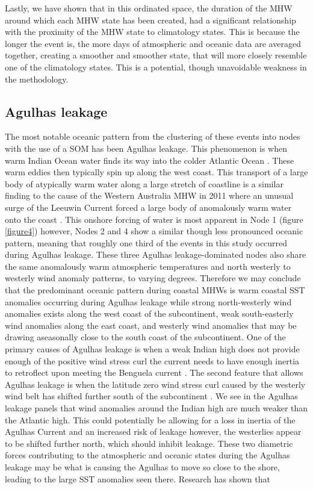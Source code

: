 \documentclass[utf8]{frontiersSCNS}
\begin{document}
Lastly, we have shown that in this ordinated space, the duration of the MHW around which each MHW state has been created, had a significant relationship with the proximity of the MHW state to climatology states. This is because the longer the event is, the more days of atmospheric and oceanic data are averaged together, creating a smoother and smoother state, that will more closely resemble one of the climatology states. This is a potential, though unavoidable weakness in the methodology.

\subsection{Agulhas leakage}
The most notable oceanic pattern from the clustering of these events into nodes with the use of a SOM has been Agulhas leakage. This phenomenon is when warm Indian Ocean water finds its way into the colder Atlantic Ocean \citep{Beal2011}. These warm eddies then typically spin up along the west coast. This transport of a large body of atypically warm water along a large stretch of coastline is a similar finding to the cause of the Western Australia MHW in 2011 where an unusual surge of the Leeuwin Current forced a large body of anomalously warm water onto the coast \citep{Feng2013, Benthuysen2014}. This onshore forcing of water is most apparent in Node 1 (figure \ref{figure4}) however, Nodes 2 and 4 show a similar though less pronounced oceanic pattern, meaning that roughly one third of the events in this study occurred during Agulhas leakage. These three Agulhas leakage-dominated nodes also share the same anomalously warm atmospheric temperatures and north westerly to westerly wind anomaly patterns, to varying degrees. Therefore we may conclude that the predominant oceanic pattern during coastal MHWs is warm coastal SST anomalies occurring during Agulhas leakage while strong north-westerly wind anomalies exists along the west coast of the subcontinent, weak south-easterly wind anomalies along the east coast, and westerly wind anomalies that may be drawing aseasonally close to the south coast of the subcontinent. One of the primary causes of Agulhas leakage is when a weak Indian high does not provide enough of the positive wind stress curl the current needs to have enough inertia to retroflect upon meeting the Benguela current \citep{Beal2011}. The second feature that allows Agulhas leakage is when the latitude zero wind stress curl caused by the westerly wind belt has shifted further south of the subcontinent \citep{Beal2011}. We see in the Agulhas leakage panels that wind anomalies around the Indian high are much weaker than the Atlantic high. This could potentially be allowing for a loss in inertia of the Agulhas Current and an increased risk of leakage however, the westerlies appear to be shifted further north, which should inhibit leakage. These two diametric forces contributing to the atmospheric and oceanic states during the Agulhas leakage may be what is causing the Agulhas to move so close to the shore, leading to the large SST anomalies seen there. Research has shown that 
\end{document}
